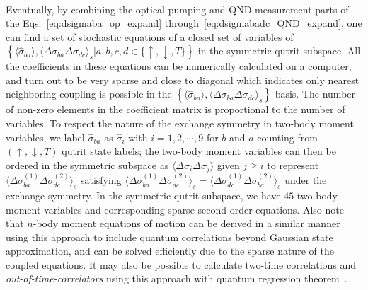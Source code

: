 \documentclass[aps,pra,twocolumn,superscriptaddress]{revtex4-1} %
\newcommand{\expect}[1]{\big\langle #1 \big\rangle}
\begin{document}
\begin{appendix}
\begin{align}
\end{align}
Eventually, by combining the optical pumping and QND measurement parts of the Eqs.~\eqref{eq:dsigmaba_op_expand} through~\eqref{eq:dsigmabadc_QND_expand}, one can find a set of stochastic equations of a closed set of variables of $ \left\{\expect{\hat{\sigma}_{ba}},\expect{\Delta\sigma_{ba}\Delta\sigma_{dc} }_s\left|a,b,c,d\in \{\uparrow,\downarrow,T \}\right. \right\} $ in the symmetric qutrit subspace. All the coefficients in these equations can be numerically calculated on a computer, and turn out to be very sparse and close to diagonal which indicates only nearest neighboring coupling is possible in the $\left\{\expect{\hat{\sigma}_{ba}},\expect{\Delta\sigma_{ba}\Delta\sigma_{dc} }_s\right\}$ basis. The number of non-zero elements in the coefficient matrix is proportional to the number of variables. To respect the nature of the exchange symmetry in two-body moment variables, we label $ \hat{\sigma}_{ba} $ as $ \hat{\sigma}_i $ with $ i=1,2,\cdots, 9 $ for $ b$ and $a  $ counting from $ (\uparrow,\downarrow,T) $ qutrit state labels; the two-body moment variables can then be ordered in the symmetric subspace as $ \expect{\Delta\sigma_i\Delta\sigma_j} $ given $ j\ge i $ to represent $ \expect{\!\Delta \sigma_{ba}^{(\!1\!)}\! \Delta \sigma_{dc}^{(\!2\!)}}_s $ satisfying $ \expect{\!\Delta \sigma_{ba}^{(\!1\!)}\! \Delta \sigma_{dc}^{(\!2\!)}}_s=\expect{\!\Delta \sigma_{dc}^{(\!1\!)}\! \Delta \sigma_{ba}^{(\!2\!)}}_s $ under the exchange symmetry. In the symmetric qutrit subspace, we have $ 45 $ two-body moment variables and corresponding sparse second-order equations. Also note that $ n $-body moment equations of motion can be derived in a similar manner using this approach to include quantum correlations beyond Gaussian state approximation, and can be solved efficiently due to the sparse nature of the coupled equations. It may also be possible to calculate two-time correlations and \textit{out-of-time-correlators} using this approach with quantum regression theorem~\cite{Swingle2016Measuring,Swain1981Master}.


\end{appendix}
\end{document}

